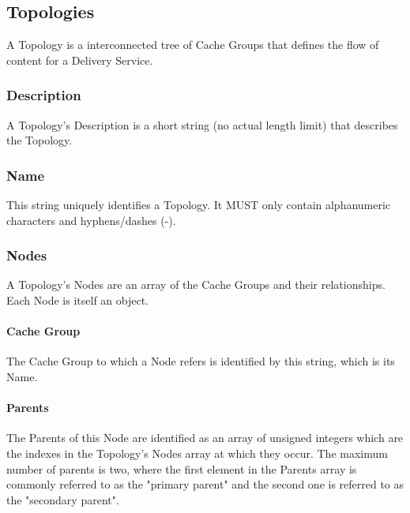 %
%

\subsection{Topologies}
A Topology is a interconnected tree of Cache Groups that defines the flow of
content for a Delivery Service.

\subsubsection{Description}
A Topology's Description is a short string (no actual length limit) that
describes the Topology.

\subsubsection{Name}
This string uniquely identifies a Topology. It MUST only contain alphanumeric
characters and hyphens/dashes (-).

\subsubsection{Nodes}
A Topology's Nodes are an array of the Cache Groups and their relationships.
Each Node is itself an object.

\paragraph{Cache Group}
The Cache Group to which a Node refers is identified by this string, which is
its Name.

\paragraph{Parents}
The Parents of this Node are identified as an array of unsigned integers which
are the indexes in the Topology's Nodes array at which they occur. The maximum
number of parents is two, where the first element in the Parents array is
commonly referred to as the "primary parent" and the second one is referred to
as the "secondary parent".
